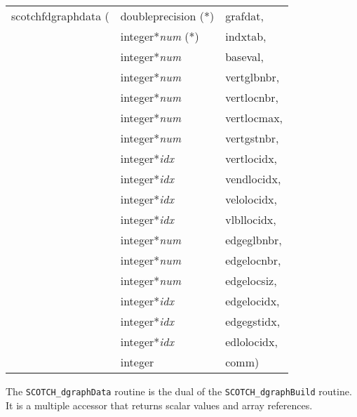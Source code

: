 \begin{itemize}
{\tt\begin{tabular}{l@{}ll}
scotchfdgraphdata ( & doubleprecision (*)   & grafdat,    \\
                    & integer*{\it num} (*) & indxtab,    \\
                    & integer*{\it num}     & baseval,    \\
                    & integer*{\it num}     & vertglbnbr, \\
                    & integer*{\it num}     & vertlocnbr, \\
                    & integer*{\it num}     & vertlocmax, \\
                    & integer*{\it num}     & vertgstnbr, \\
                    & integer*{\it idx}     & vertlocidx, \\
                    & integer*{\it idx}     & vendlocidx, \\
                    & integer*{\it idx}     & velolocidx, \\
                    & integer*{\it idx}     & vlbllocidx, \\
                    & integer*{\it num}     & edgeglbnbr, \\
                    & integer*{\it num}     & edgelocnbr, \\
                    & integer*{\it num}     & edgelocsiz, \\
                    & integer*{\it idx}     & edgelocidx, \\
                    & integer*{\it idx}     & edgegstidx, \\
                    & integer*{\it idx}     & edlolocidx, \\
                    & integer               & comm)
\end{tabular}}

\progdes

The {\tt SCOTCH\_dgraphData} routine is the dual of the
{\tt SCOTCH\_\lbt dgraph\lbo Build} routine. It is a multiple
accessor that returns scalar values and array references.


\end{itemize}
